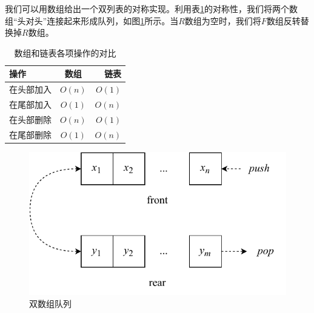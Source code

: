 \documentclass[b5paper]{ctexart}
\begin{document}
我们可以用数组给出一个双列表的对称实现。利用表\ref{tab:array-list-comp}的对称性，我们将两个数组“头对头”连接起来形成队列，如图\ref{fig:horseshoe-array}所示。当$R$数组为空时，我们将$F$数组反转替换掉$R$数组。

\begin{table}[htbp]
\centering
\begin{tabular}{l | c | r}
  \hline
  操作 & 数组 & 链表 \\
  \hline
  在头部加入 & $O(n)$ & $O(1)$ \\
  在尾部加入 & $O(1)$ & $O(n)$ \\
  在头部删除 & $O(n)$ & $O(1)$ \\
  在尾部删除 & $O(1)$ & $O(n)$ \\
  \hline
\end{tabular}
\caption{数组和链表各项操作的对比} \label{tab:array-list-comp}
\end{table}

\begin{figure}[htbp]
  \centering
  \includegraphics[scale=0.6]{img/paired-arrayq}
  \caption{双数组队列}
  \label{fig:horseshoe-array}
\end{figure}

\begin{Exercise}
\end{Exercise}

\begin{Answer}
\end{Answer}
\end{document}
